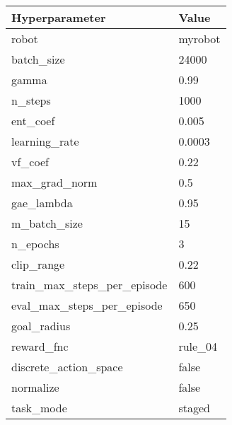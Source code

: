 \begin{table}[!h]
 \centering
 \label{table:hyperparameters-human}
 \begin{tabular}{|l|l|}
 \hline
 \textbf{Hyperparameter} & \textbf{Value} \\ \hline
 robot & myrobot \\ \hline
 batch\_size & 24000 \\ \hline
 gamma & 0.99 \\ \hline
 n\_steps & 1000 \\ \hline
 ent\_coef & 0.005 \\ \hline
 learning\_rate & 0.0003 \\ \hline
 vf\_coef & 0.22 \\ \hline
 max\_grad\_norm & 0.5 \\ \hline
 gae\_lambda & 0.95 \\ \hline
 m\_batch\_size & 15 \\ \hline
 n\_epochs & 3 \\ \hline
 clip\_range & 0.22 \\ \hline
 train\_max\_steps\_per\_episode & 600 \\ \hline
 eval\_max\_steps\_per\_episode & 650 \\ \hline
 goal\_radius & 0.25 \\ \hline
 reward\_fnc & rule\_04 \\ \hline
 discrete\_action\_space & false \\ \hline
 normalize & false \\ \hline
 task\_mode & staged \\ \hline
 \end{tabular}
 \bigskip
\end{table}